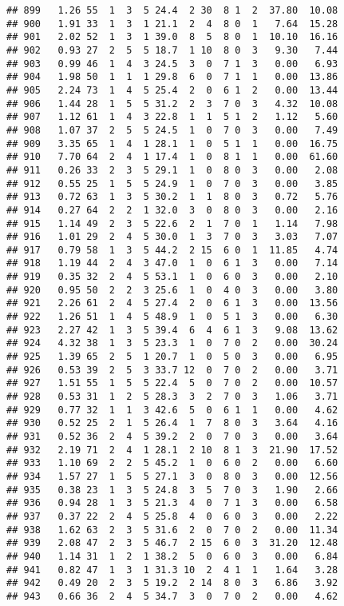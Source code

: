 \documentclass[
]{article}
\begin{document}
\begin{verbatim}
## 899   1.26 55  1  3  5 24.4  2 30  8 1  2  37.80  10.08
## 900   1.91 33  1  3  1 21.1  2  4  8 0  1   7.64  15.28
## 901   2.02 52  1  3  1 39.0  8  5  8 0  1  10.10  16.16
## 902   0.93 27  2  5  5 18.7  1 10  8 0  3   9.30   7.44
## 903   0.99 46  1  4  3 24.5  3  0  7 1  3   0.00   6.93
## 904   1.98 50  1  1  1 29.8  6  0  7 1  1   0.00  13.86
## 905   2.24 73  1  4  5 25.4  2  0  6 1  2   0.00  13.44
## 906   1.44 28  1  5  5 31.2  2  3  7 0  3   4.32  10.08
## 907   1.12 61  1  4  3 22.8  1  1  5 1  2   1.12   5.60
## 908   1.07 37  2  5  5 24.5  1  0  7 0  3   0.00   7.49
## 909   3.35 65  1  4  1 28.1  1  0  5 1  1   0.00  16.75
## 910   7.70 64  2  4  1 17.4  1  0  8 1  1   0.00  61.60
## 911   0.26 33  2  3  5 29.1  1  0  8 0  3   0.00   2.08
## 912   0.55 25  1  5  5 24.9  1  0  7 0  3   0.00   3.85
## 913   0.72 63  1  3  5 30.2  1  1  8 0  3   0.72   5.76
## 914   0.27 64  2  2  1 32.0  3  0  8 0  3   0.00   2.16
## 915   1.14 49  2  3  5 22.6  2  1  7 0  1   1.14   7.98
## 916   1.01 29  2  4  5 30.0  1  3  7 0  3   3.03   7.07
## 917   0.79 58  1  3  5 44.2  2 15  6 0  1  11.85   4.74
## 918   1.19 44  2  4  3 47.0  1  0  6 1  3   0.00   7.14
## 919   0.35 32  2  4  5 53.1  1  0  6 0  3   0.00   2.10
## 920   0.95 50  2  2  3 25.6  1  0  4 0  3   0.00   3.80
## 921   2.26 61  2  4  5 27.4  2  0  6 1  3   0.00  13.56
## 922   1.26 51  1  4  5 48.9  1  0  5 1  3   0.00   6.30
## 923   2.27 42  1  3  5 39.4  6  4  6 1  3   9.08  13.62
## 924   4.32 38  1  3  5 23.3  1  0  7 0  2   0.00  30.24
## 925   1.39 65  2  5  1 20.7  1  0  5 0  3   0.00   6.95
## 926   0.53 39  2  5  3 33.7 12  0  7 0  2   0.00   3.71
## 927   1.51 55  1  5  5 22.4  5  0  7 0  2   0.00  10.57
## 928   0.53 31  1  2  5 28.3  3  2  7 0  3   1.06   3.71
## 929   0.77 32  1  1  3 42.6  5  0  6 1  1   0.00   4.62
## 930   0.52 25  2  1  5 26.4  1  7  8 0  3   3.64   4.16
## 931   0.52 36  2  4  5 39.2  2  0  7 0  3   0.00   3.64
## 932   2.19 71  2  4  1 28.1  2 10  8 1  3  21.90  17.52
## 933   1.10 69  2  2  5 45.2  1  0  6 0  2   0.00   6.60
## 934   1.57 27  1  5  5 27.1  3  0  8 0  3   0.00  12.56
## 935   0.38 23  1  3  5 24.8  3  5  7 0  3   1.90   2.66
## 936   0.94 28  1  3  5 21.3  4  0  7 1  3   0.00   6.58
## 937   0.37 22  2  4  5 25.8  4  0  6 0  3   0.00   2.22
## 938   1.62 63  2  3  5 31.6  2  0  7 0  2   0.00  11.34
## 939   2.08 47  2  3  5 46.7  2 15  6 0  3  31.20  12.48
## 940   1.14 31  1  2  1 38.2  5  0  6 0  3   0.00   6.84
## 941   0.82 47  1  3  1 31.3 10  2  4 1  1   1.64   3.28
## 942   0.49 20  2  3  5 19.2  2 14  8 0  3   6.86   3.92
## 943   0.66 36  2  4  5 34.7  3  0  7 0  2   0.00   4.62

\end{verbatim}
\end{document}

